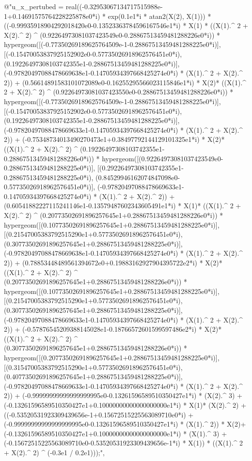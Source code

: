{@"u\_x\_pertubed = real((-0.32953067134717515988e-1+0.14691575764228225878e0*i) * exp(0.1e1*i * atan2(X(2), X(1))) * ((-0.99935918904292018420e0-0.13523363784596167546e1*i) * X(1) * ((X(1).^ 2 + X(2).^ 2) ^ (0.92264973081037423549e0-0.28867513459481288226e0*i)) * hypergeom([(-0.77350269189625764509e-1-0.28867513459481288225e0*i)], [(-0.15470053837925152902e0-0.57735026918962576451e0*i), (0.19226497308103742355e1-0.28867513459481288225e0*i)], (-0.97820497088478669638e1-0.14705934397668425274e0*i) * (X(1).^ 2 + X(2).^ 2)) + (0.56614891583101072089e0-0.16255295566023115846e1*i) * X(2)* ((X(1).^ 2 + X(2).^ 2) ^ (0.92264973081037423550e0-0.28867513459481288226e0*i)) * hypergeom([(-0.77350269189625764509e-1-0.28867513459481288225e0*i)], [(-0.15470053837925152902e0-0.57735026918962576451e0*i), (0.19226497308103742355e1-0.28867513459481288225e0*i)], (-0.97820497088478669633e1-0.14705934397668425274e0*i) * (X(1).^ 2 + X(2).^ 2)) + (-0.75348734013490270473e1+0.38497792144129101325e1*i) * X(2)* ((X(1).^ 2 + X(2).^ 2) ^ (0.19226497308103742355e1-0.28867513459481288226e0*i)) * hypergeom([(0.92264973081037423549e0-0.28867513459481288225e0*i)], [(0.29226497308103742355e1-0.28867513459481288225e0*i), (0.84529946162074847098e0-0.57735026918962576451e0*i)], (-0.97820497088478669633e1-0.14705934397668425274e0*i) * (X(1).^ 2 + X(2).^ 2)) + (0.60541882227115241146e1-0.13579487602343605491e1*i) * X(1)* ((X(1).^ 2 + X(2).^ 2) ^ (0.20773502691896257645e1+0.28867513459481288226e0*i)) * hypergeom([(0.10773502691896257645e1+0.28867513459481288225e0*i)], [(0.21547005383792515290e1+0.57735026918962576451e0*i), (0.30773502691896257645e1+0.28867513459481288225e0*i)], (-0.97820497088478669638e1-0.14705934397668425274e0*i) * (X(1).^ 2 + X(2).^ 2)) + (0.78853448489561394672e0+0.19883162927904395722e2*i) * X(2)* ((X(1).^ 2 + X(2).^ 2) ^ (0.20773502691896257645e1+0.28867513459481288226e0*i)) * hypergeom([(0.10773502691896257645e1+0.28867513459481288225e0*i)], [(0.21547005383792515290e1+0.57735026918962576451e0*i), (0.30773502691896257645e1+0.28867513459481288225e0*i)], (-0.97820497088478669633e1-0.14705934397668425274e0*i) * (X(1).^ 2 + X(2).^ 2)) + (-0.57876545209388145028e1-0.18766572601599597486e2*i) * X(2)* ((X(1).^ 2 + X(2).^ 2) ^ (0.30773502691896257645e1+0.28867513459481288226e0*i)) * hypergeom([(0.20773502691896257645e1+0.28867513459481288225e0*i)], [(0.31547005383792515290e1+0.57735026918962576451e0*i), (0.40773502691896257645e1+0.28867513459481288225e0*i)], (-0.97820497088478669633e1-0.14705934397668425274e0*i) * (X(1).^ 2 + X(2).^ 2)) + (-0.99999999999999999995e0-0.13261596589510350427e1*i) * (X(2).^ 3) + (-0.13261596589510350427e1+0.10000000000000000000e1*i) * X(1)* (X(2).^ 2) + ((-0.53520531923309439656e-1+0.15672515225563089710e0*i) + (-0.99999999999999999995e0-0.13261596589510350427e1*i) * (X(1).^ 2)) * X(2)+ (-0.13261596589510350427e1+0.10000000000000000000e1*i) * (X(1).^ 3) + (-0.15672515225563089710e0-0.53520531923309439656e-1*i) * X(1)) * ((X(1).^ 2 + X(2).^ 2) ^ (-0.3e1 / 0.2e1)));",\newline 
}
